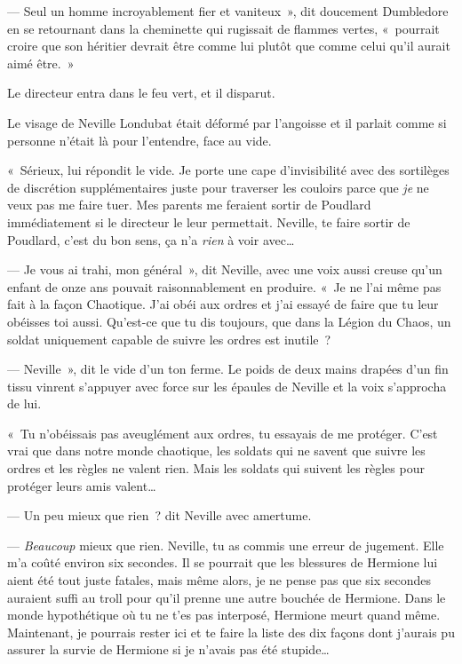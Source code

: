 --- Seul un homme incroyablement fier et vaniteux~», dit doucement Dumbledore en se retournant dans la cheminette qui rugissait de flammes vertes, «~pourrait croire que son héritier devrait être comme lui plutôt que comme celui qu'il aurait aimé être.~»

Le directeur entra dans le feu vert, et il disparut.


Le visage de Neville Londubat était déformé par l'angoisse et il parlait comme si personne n'était là pour l'entendre, face au vide.

«~Sérieux, lui répondit le vide.
Je porte une cape d'invisibilité avec des sortilèges de discrétion supplémentaires juste pour traverser les couloirs parce que \emph{je} ne veux pas me faire tuer.
Mes parents me feraient sortir de Poudlard immédiatement si le directeur le leur permettait.
Neville, te faire sortir de Poudlard, c'est du bon sens, ça n'a \emph{rien} à voir avec…

--- Je vous ai trahi, mon général~», dit Neville, avec une voix aussi creuse qu'un enfant de onze ans pouvait raisonnablement en produire.
«~Je ne l'ai même pas fait à la façon Chaotique.
J'ai obéi aux ordres et j'ai essayé de faire que tu leur obéisses toi aussi.
Qu'est-ce que tu dis toujours, que dans la Légion du Chaos, un soldat uniquement capable de suivre les ordres est inutile~?

--- Neville~», dit le vide d'un ton ferme.
Le poids de deux mains drapées d'un fin tissu vinrent s'appuyer avec force sur les épaules de Neville et la voix s'approcha de lui.

«~Tu n'obéissais pas aveuglément aux ordres, tu essayais de me protéger.
C'est vrai que dans notre monde chaotique, les soldats qui ne savent que suivre les ordres et les règles ne valent rien.
Mais les soldats qui suivent les règles pour protéger leurs amis valent…

--- Un peu mieux que rien~? dit Neville avec amertume.

--- \emph{Beaucoup} mieux que rien.
Neville, tu as commis une erreur de jugement.
Elle m'a coûté environ six secondes.
Il se pourrait que les blessures de Hermione lui aient été tout juste fatales, mais même alors, je ne pense pas que six secondes auraient suffi au troll pour qu'il prenne une autre bouchée de Hermione.
Dans le monde hypothétique où tu ne t'es pas interposé, Hermione meurt quand même.
Maintenant, je pourrais rester ici et te faire la liste des dix façons dont j'aurais pu assurer la survie de Hermione si je n'avais pas été stupide…

